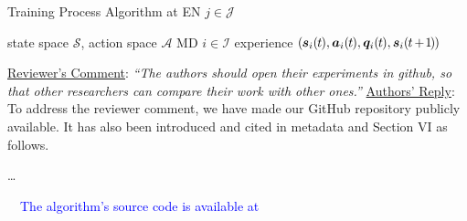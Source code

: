 \documentclass[12pt,draftclsnofoot,onecolumn]{IEEEtran}
\newcommand{\rev}[1]{{\color{blue}#1}} %
\newcommand{\rev}[1]{#1}
\newenvironment{my}[2]%
{\begin{list}{}%
{\setlength{\rightmargin}{#1}\setlength{\leftmargin}{#2}}%


 \item[]{}

} {\end{list}}
\begin{document}
\begin{enumerate}
\begin{my}{0.5cm}{0.5cm}
{\begin{minipage}[b]{0.87\textwidth} 
	\begin{algorithm}[H] \caption{Training Process Algorithm at EN $j \in \mathcal{J}$}\label{alg:cap2} \centering 
		\begin{algorithmic}[1] \renewcommand{\algorithmicrequire}{\textbf{Input:}} \renewcommand{\algorithmicensure}{\textbf{Output:}}\Require state space $\mathcal{S}$, action space $\mathcal{A}$
			\Ensure MD $i \in \mathcal{I}$ experience  \textcolor{blue}{ $(\hspace{-0.2mm}\boldsymbol{s}_i(\hspace{-0.2mm}t\hspace{-0.2mm}), \boldsymbol{a}_i(\hspace{-0.2mm}t\hspace{-0.2mm}), \boldsymbol{q}_i(\hspace{-0.2mm}t\hspace{-0.2mm}), \boldsymbol{s}_i(\hspace{-0.2mm}t\hspace{-0.3mm}+\hspace{-0.3mm}\hspace{-0.2mm}1\hspace{-0.2mm}\hspace{-0.2mm})\hspace{-0.2mm})$}
		\end{algorithmic} 
	\end{algorithm} 
\end{minipage}}
\end{my}
	

\vspace{10mm}
	\item \underline{Reviewer's Comment}: 
	\textit{``The authors should open their experiments in github, so that other researchers can compare their work with other ones.''} \newline
	\underline{Authors' Reply}: To address the reviewer comment, we have made our GitHub repository  publicly available. It has also been introduced and cited in metadata and Section VI as follows.
	
	\begin{my}{1cm}{1cm}
		\rev{
			
			\dots
			
			\,\,\,\, \textcolor{blue}{The algorithm's source code is available at \cite{QECO}}

	}
	\end{my} \vspace{6mm}


\end{enumerate}
\end{document}

